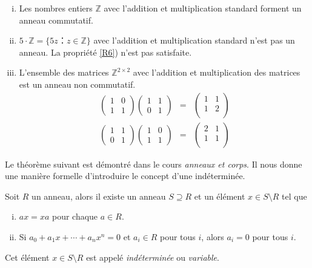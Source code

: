 \begin{example}
  \label{exe:32}
  \begin{enumerate}[i)]
  \item Les nombres entiers $ℤ$ avec l'addition et multiplication standard forment un anneau commutatif.
  \item $5 ⋅ℤ = \{ 5 z ：z ∈ ℤ\}$ avec l'addition et multiplication standard n'est pas un anneau. La propriété \ref{R6}) n'est pas satisfaite.
  \item L'ensemble des matrices  $ℤ^{2 ×2}$ avec l'addition et multiplication des matrices est un anneau non commutatif. 
    \begin{eqnarray*}
      \begin{pmatrix}
        1 & 0 \\
        1 & 1 
      \end{pmatrix}
       \begin{pmatrix}
        1 & 1 \\
         0& 1 
       \end{pmatrix}   & = &
                            \begin{pmatrix}
                               1 & 1 \\
                               1 & 2 \\
                             \end{pmatrix}  \\      
      \begin{pmatrix}
        1 & 1 \\
        0 & 1 
      \end{pmatrix}
       \begin{pmatrix}
        1 & 0 \\
         1 & 1 
       \end{pmatrix}   & = &
                            \begin{pmatrix}
                               2 & 1 \\
                               1 & 1 \\
                             \end{pmatrix}       
    \end{eqnarray*}
  \end{enumerate}
\end{example}

Le théorème suivant est démontré dans le cours \emph{anneaux et corps}.   Il nous donne une manière formelle d'introduire le concept d'une indéterminée. 
\begin{theorem}
  \label{thr:50}
  Soit $R$ un anneau, alors il existe un anneau $S ⊇R$ et un élément $x ∈ S \setminus R$ tel que
  \begin{enumerate}[(i)]
  \item $a x = x a $ pour chaque $a ∈ R$.
  \item Si 
    $  a_0+ a_1x + \cdots + a_n x^n =0$  et $a_i ∈R$ pour tous $i$,  
    alors  $a_i = 0$ pour tous $i$.
  \end{enumerate}
\end{theorem}
Cet élément $x ∈ S \setminus R$ est appelé  \emph{indéterminée} ou  \emph{variable}.  

